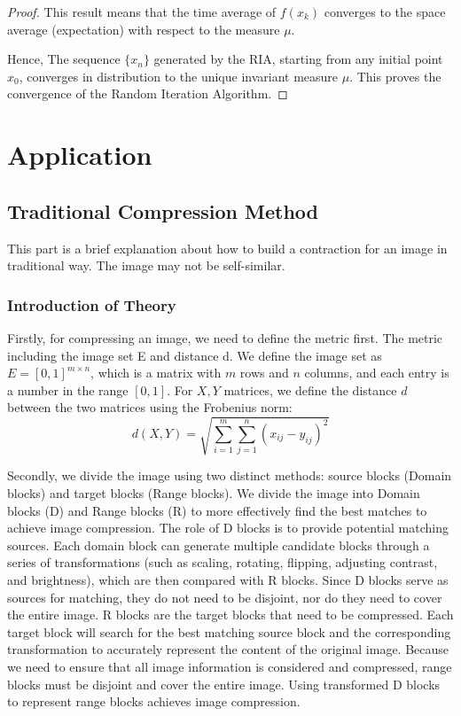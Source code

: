 \documentclass[a4paper,11pt, titlepage]{article}
\theoremstyle{definition}
\theoremstyle{plain}
\theoremstyle{remark}
\theoremstyle{definition}
\begin{document}
\begin{proof}
This result means that the time average of \(f(x_k)\) converges to the space average (expectation) with respect to the measure \(\mu\).

Hence, The sequence \(\{x_n\}\) generated by the RIA, starting from any initial point \(x_0\), converges in distribution to the unique invariant measure \(\mu\). This proves the convergence of the Random Iteration Algorithm.
\end{proof}

\section{Application}

\subsection{Traditional Compression Method}
This part is a brief explanation about how to build a contraction for an image in traditional way. The image may not be self-similar.
\subsubsection{Introduction of Theory}

Firstly, for compressing an image, we need to define the metric first. The metric including the image set E and distance d. We define the image set as \( E = [0,1]^{m \times n} \), which is a matrix with \( m \) rows and \( n \) columns, and each entry is a number in the range \([0,1]\). For $X, Y$ matrices, we define the distance \( d \) between the two matrices using the Frobenius norm:
\[
d(X, Y) = \sqrt{\sum_{i=1}^{m} \sum_{j=1}^{n} (x_{ij} - y_{ij})^2}
\]

Secondly, we divide the image using two distinct methods: source blocks (Domain blocks) and target blocks (Range blocks). We divide the image into Domain blocks (D) and Range blocks (R) to more effectively find the best matches to achieve image compression. The role of D blocks is to provide potential matching sources. Each domain block can generate multiple candidate blocks through a series of transformations (such as scaling, rotating, flipping, adjusting contrast, and brightness), which are then compared with R blocks. Since D blocks serve as sources for matching, they do not need to be disjoint, nor do they need to cover the entire image.
R blocks are the target blocks that need to be compressed. Each target block will search for the best matching source block and the corresponding transformation to accurately represent the content of the original image. Because we need to ensure that all image information is considered and compressed, range blocks must be disjoint and cover the entire image. Using transformed D blocks to represent range blocks achieves image compression.
\end{document}
